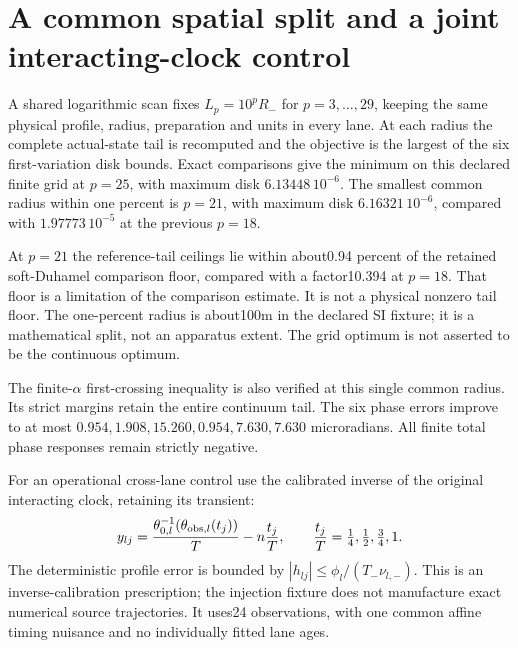 \section{A common spatial split and a joint interacting-clock control}
A shared logarithmic scan fixes $L_p=10^pR_-$ for $p=3,\ldots,29$, keeping
the same physical profile, radius, preparation and units in every lane.
At each radius the complete actual-state tail is recomputed and the objective
is the largest of the six first-variation disk bounds. Exact comparisons
give the minimum on this declared finite grid at $p=25$, with maximum disk
$6.13448\,10^{-6}$. The smallest common radius within one percent is
$p=21$, with maximum disk $6.16321\,10^{-6}$, compared with
$1.97773\,10^{-5}$ at the previous $p=18$.

At $p=21$ the reference-tail ceilings lie within about0.94 percent of the
retained soft-Duhamel comparison floor, compared with a factor10.394 at
$p=18$. That floor is a limitation of the comparison estimate. It is not a
physical nonzero tail floor. The one-percent radius is about100m in the
declared SI fixture; it is a mathematical split, not an apparatus extent.
The grid optimum is not asserted to be the continuous optimum.

The finite-$\alpha$ first-crossing inequality is also verified at this
single common radius. Its strict margins retain the entire continuum tail.
The six phase errors improve to at most
$0.954,1.908,15.260,0.954,7.630,7.630$ microradians. All finite total phase
responses remain strictly negative.

For an operational cross-lane control use the calibrated inverse of the
original interacting clock, retaining its transient:
\[
 y_{lj}=\frac{\theta_{0,l}^{-1}(\theta_{{\rm obs},l}(t_j))}{T}
              -n\frac{t_j}{T},\qquad
 \frac{t_j}{T}=\tfrac14,\tfrac12,\tfrac34,1.
\]
The deterministic profile error is bounded by
$|h_{lj}|\le\phi_l/(T_-\nu_{l,-})$. This is an inverse-calibration
prescription; the injection fixture does not manufacture exact numerical
source trajectories. It uses24 observations, with one common affine timing
nuisance and no individually fitted lane ages.

